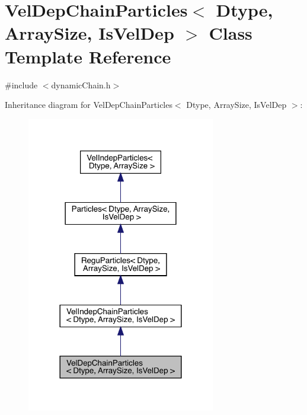 \hypertarget{class_vel_dep_chain_particles}{}\section{Vel\+Dep\+Chain\+Particles$<$ Dtype, Array\+Size, Is\+Vel\+Dep $>$ Class Template Reference}
\label{class_vel_dep_chain_particles}


{\ttfamily \#include $<$dynamic\+Chain.\+h$>$}



Inheritance diagram for Vel\+Dep\+Chain\+Particles$<$ Dtype, Array\+Size, Is\+Vel\+Dep $>$\+:
\nopagebreak
\begin{figure}[H]
\begin{center}
\leavevmode
\includegraphics[width=233pt]{class_vel_dep_chain_particles__inherit__graph}
\end{center}
\end{figure}



